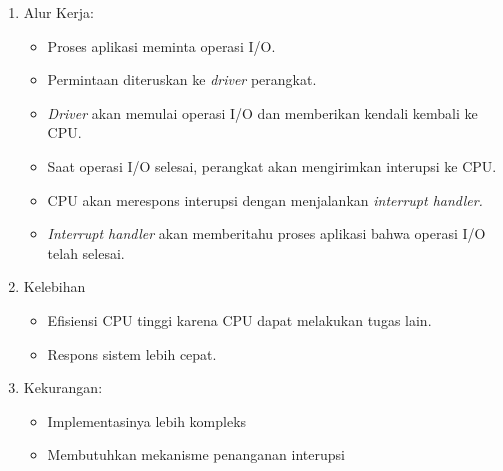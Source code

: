 \documentclass[12pt]{article}
\begin{document}
\begin{enumerate}
\begin{enumerate}
        \item Alur Kerja:
        \begin{itemize}
            \item Proses aplikasi meminta operasi I/O.
            \item Permintaan diteruskan ke \textit{driver} perangkat.
            \item \textit{Driver} akan memulai operasi I/O dan memberikan kendali kembali ke CPU.
            \item Saat operasi I/O selesai, perangkat akan mengirimkan interupsi ke CPU.
            \item CPU akan merespons interupsi dengan menjalankan \emph{interrupt handler.}
            \item \emph{Interrupt handler} akan memberitahu proses aplikasi bahwa operasi I/O telah selesai. 
        \end{itemize}
        \item Kelebihan
        \begin{itemize}
            \item Efisiensi CPU tinggi karena CPU dapat melakukan tugas lain.
            \item Respons sistem lebih cepat.
        \end{itemize}
        \item Kekurangan:
        \begin{itemize}
            \item Implementasinya lebih kompleks
            \item Membutuhkan mekanisme penanganan interupsi
        \end{itemize}
    \end{enumerate}
\end{enumerate}
\end{document}
